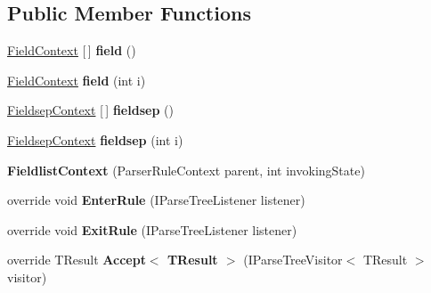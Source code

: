\subsection*{Public Member Functions}
\begin{DoxyCompactItemize}
\item 
\mbox{\label{classzlua_1_1_lua_parser_1_1_fieldlist_context_af23c267c9d523ddb307a9b2212182e56}} 
\mbox{\hyperlink{classzlua_1_1_lua_parser_1_1_field_context}{Field\+Context}} \mbox{[}$\,$\mbox{]} {\bfseries field} ()
\item 
\mbox{\label{classzlua_1_1_lua_parser_1_1_fieldlist_context_a04808cb40c2c64b0728b69e814961cfa}} 
\mbox{\hyperlink{classzlua_1_1_lua_parser_1_1_field_context}{Field\+Context}} {\bfseries field} (int i)
\item 
\mbox{\label{classzlua_1_1_lua_parser_1_1_fieldlist_context_a8424fe4821feb1d99c5dc6d167aa33e4}} 
\mbox{\hyperlink{classzlua_1_1_lua_parser_1_1_fieldsep_context}{Fieldsep\+Context}} \mbox{[}$\,$\mbox{]} {\bfseries fieldsep} ()
\item 
\mbox{\label{classzlua_1_1_lua_parser_1_1_fieldlist_context_ad782722b3bc7ee0cd36731dc721ca848}} 
\mbox{\hyperlink{classzlua_1_1_lua_parser_1_1_fieldsep_context}{Fieldsep\+Context}} {\bfseries fieldsep} (int i)
\item 
\mbox{\label{classzlua_1_1_lua_parser_1_1_fieldlist_context_ada3b3444401a79a3e0d15594ad690fae}} 
{\bfseries Fieldlist\+Context} (Parser\+Rule\+Context parent, int invoking\+State)
\item 
\mbox{\label{classzlua_1_1_lua_parser_1_1_fieldlist_context_a4a967e8f50aabec16080e5525976d9ee}} 
override void {\bfseries Enter\+Rule} (I\+Parse\+Tree\+Listener listener)
\item 
\mbox{\label{classzlua_1_1_lua_parser_1_1_fieldlist_context_a023b3d1aebdbb731ec0c8d841f39b00b}} 
override void {\bfseries Exit\+Rule} (I\+Parse\+Tree\+Listener listener)
\item 
\mbox{\label{classzlua_1_1_lua_parser_1_1_fieldlist_context_ad7bf67fc8cfa0133e99bddbc1a875c89}} 
override T\+Result {\bfseries Accept$<$ T\+Result $>$} (I\+Parse\+Tree\+Visitor$<$ T\+Result $>$ visitor)
\end{DoxyCompactItemize}
